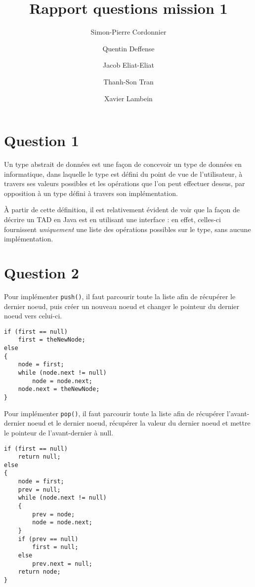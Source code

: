 \documentclass[a4paper,10pt]{article}
\title{Rapport questions mission 1}
\author{Simon-Pierre Cordonnier \and Quentin Deffense \and Jacob Eliat-Eliat \and Thanh-Son Tran \and Xavier Lambein}
\begin{document}
\maketitle

\vspace{0.7cm}

\section*{Question 1}

Un type abstrait de données est une façon de concevoir un type de données en informatique, dans laquelle le type est défini du point de vue de l'utilisateur, à travers ses valeurs possibles et les opérations que l'on peut effectuer dessus, par opposition à un type défini à travers son implémentation\cite{adtwiki}.

À partir de cette définition, il est relativement évident de voir que la façon de décrire un TAD en Java est en utilisant une interface : en effet, celles-ci fournissent \emph{uniquement} une liste des opérations possibles sur le type, sans aucune implémentation.

\section*{Question 2}

Pour implémenter \texttt{push()}, il faut parcourir toute la liste afin de récupérer le dernier noeud, puis créer un nouveau noeud et changer le pointeur du dernier noeud vers celui-ci.

\begin{lstlisting}
if (first == null)
    first = theNewNode;
else
{
    node = first;
    while (node.next != null)
        node = node.next;
    node.next = theNewNode;
}
\end{lstlisting}

Pour implémenter \texttt{pop()}, il faut parcourir toute la liste afin de récupérer l'avant-dernier noeud et le dernier noeud, récupérer la valeur du dernier noeud et mettre le pointeur de l'avant-dernier à null.

\begin{lstlisting}
if (first == null)
    return null;
else
{
    node = first;
    prev = null;
    while (node.next != null)
    {
        prev = node;
        node = node.next;
    }
    if (prev == null)
        first = null;
    else
        prev.next = null;
    return node;
}
\end{lstlisting}
\end{document}
